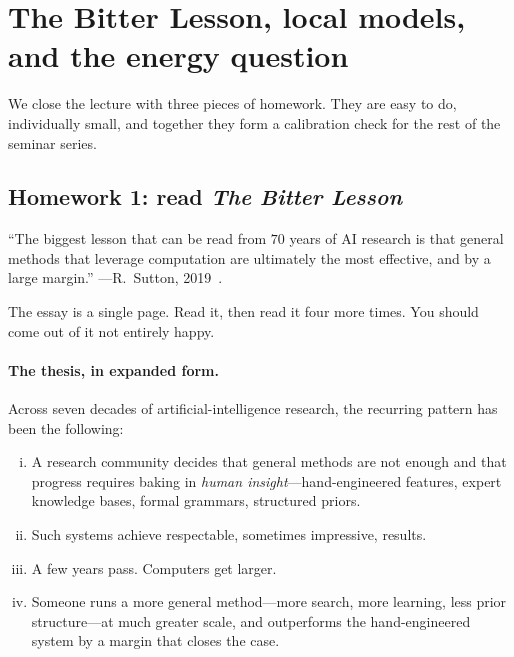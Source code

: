 
\section{The Bitter Lesson, local models, and the energy question}%
\label{sec:bitter-lesson}

We close the lecture with three pieces of homework.  They are
easy to do, individually small, and together they form a
calibration check for the rest of the seminar series.

\subsection{Homework 1: read \emph{The Bitter Lesson}}

\begin{keyresult}
  ``The biggest lesson that can be read from $70$ years of AI
  research is that general methods that leverage computation
  are ultimately the most effective, and by a large margin.''
  \quad ---R.~Sutton, 2019~\cite{sutton2019bitter}.
\end{keyresult}

The essay is a single page.  Read it, then read it four more
times.  You should come out of it not entirely happy.

\paragraph{The thesis, in expanded form.}
Across seven decades of artificial-intelligence research, the
recurring pattern has been the following:

\begin{enumerate}[(i)]
  \item A research community decides that general methods
    are not enough and that progress requires baking in
    \emph{human insight}---hand-engineered features, expert
    knowledge bases, formal grammars, structured priors.
  \item Such systems achieve respectable, sometimes
    impressive, results.
  \item A few years pass.  Computers get larger.
  \item Someone runs a more general method---more search,
    more learning, less prior structure---at much greater
    scale, and outperforms the hand-engineered system by a
    margin that closes the case.
\end{enumerate}

